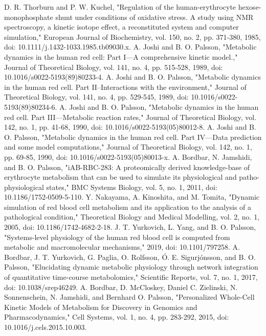 \documentclass[conference]{IEEEtran}
\begin{document}
\begin{thebibliography}{00}
 D. R. Thorburn and P. W. Kuchel, "Regulation of the human-erythrocyte hexose-monophosphate shunt under conditions of oxidative stress. A study using NMR spectroscopy, a kinetic isotope effect, a reconstituted system and computer simulation," European Journal of Biochemistry, vol. 150, no. 2, pp. 371-380, 1985, doi: 10.1111/j.1432-1033.1985.tb09030.x.
 A. Joshi and B. O. Palsson, "Metabolic dynamics in the human red cell: Part I—A comprehensive kinetic model.," Journal of Theoretical Biology, vol. 141, no. 4, pp. 515-528, 1989, doi: 10.1016/s0022-5193(89)80233-4.
 A. Joshi and B. O. Palsson, "Metabolic dynamics in the human red cell. Part II–Interactions with the environment," Journal of Theoretical Biology, vol. 141, no. 4, pp. 529-545, 1989, doi: 10.1016/s0022-5193(89)80234-6.
 A. Joshi and B. O. Palsson, "Metabolic dynamics in the human red cell. Part III—Metabolic reaction rates," Journal of Theoretical Biology, vol. 142, no. 1, pp. 41-68, 1990, doi: 10.1016/s0022-5193(05)80012-8.
 A. Joshi and B. O. Palsson, "Metabolic dynamics in the human red cell. Part IV—Data prediction and some model computations," Journal of Theoretical Biology, vol. 142, no. 1, pp. 69-85, 1990, doi: 10.1016/s0022-5193(05)80013-x.
 A. Bordbar, N. Jamshidi, and B. O. Palsson, "iAB-RBC-283: A proteomically derived knowledge-base of erythrocyte metabolism that can be used to simulate its physiological and patho-physiological states," BMC Systems Biology, vol. 5, no. 1, 2011, doi: 10.1186/1752-0509-5-110.
 Y. Nakayama, A. Kinoshita, and M. Tomita, "Dynamic simulation of red blood cell metabolism and its application to the analysis of a pathological condition," Theoretical Biology and Medical Modelling, vol. 2, no. 1, 2005, doi: 10.1186/1742-4682-2-18.
 J. T. Yurkovich, L. Yang, and B. O. Palsson, "Systems-level physiology of the human red blood cell is computed from metabolic and macromolecular mechanisms," 2019, doi: 10.1101/797258.
 A. Bordbar, J. T. Yurkovich, G. Paglia, O. Rolfsson, Ó. E. Sigurjónsson, and B. O. Palsson, "Elucidating dynamic metabolic physiology through network integration of quantitative time-course metabolomics," Scientific Reports, vol. 7, no. 1, 2017, doi: 10.1038/srep46249.
 A. Bordbar, D. McCloskey, Daniel C. Zielinski, N. Sonnenschein, N. Jamshidi, and Bernhard O. Palsson, "Personalized Whole-Cell Kinetic Models of Metabolism for Discovery in Genomics and Pharmacodynamics," Cell Systems, vol. 1, no. 4, pp. 283-292, 2015, doi: 10.1016/j.cels.2015.10.003.

\end{thebibliography}
\end{document}
